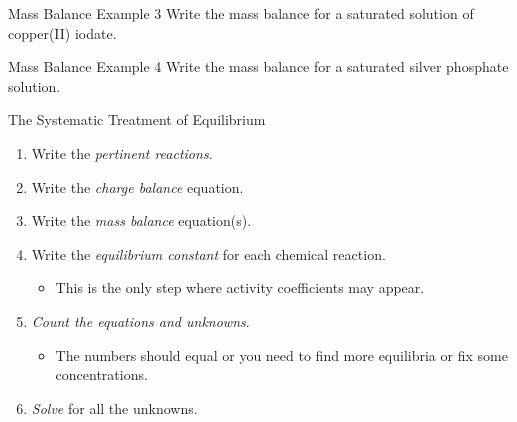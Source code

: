 \documentclass[notes=onlyslideswithnotes,notes=hide]{beamer}
\begin{document}
\begin{frame}[t]{Mass Balance Example 3}
	Write the mass balance for a saturated solution of copper(II) iodate.


\end{frame}

\begin{frame}[t]{Mass Balance Example 4}
	Write the mass balance for a saturated silver phosphate solution.


\end{frame}


\begin{frame}{The Systematic Treatment of Equilibrium}
	\begin{enumerate}
		\item Write the \emph{pertinent reactions}.
		\item Write the \emph{charge balance} equation.
		\item Write the \emph{mass balance} equation(s).
		\item Write the \emph{equilibrium constant} for each chemical
			reaction.
			\begin{itemize}
				\item This is the only step where activity
					coefficients may appear.
			\end{itemize}
		\item \emph{Count the equations and unknowns}.
			\begin{itemize}
				\item The numbers should equal or you need to
					find more equilibria or fix some
					concentrations.
			\end{itemize}
		\item \emph{Solve} for all the unknowns.
	\end{enumerate}
\end{frame}
\end{document}

